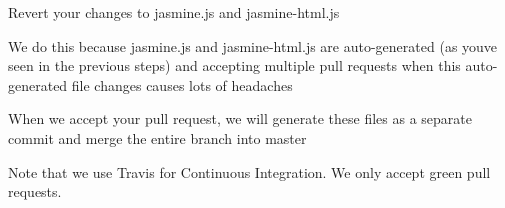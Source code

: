 \begin{DoxyEnumerate}
\item Revert your changes to {\ttfamily jasmine.\+js} and {\ttfamily jasmine-\/html.\+js}
\begin{DoxyItemize}
\item We do this because {\ttfamily jasmine.\+js} and {\ttfamily jasmine-\/html.\+js} are auto-\/generated (as you\textquotesingle{}ve seen in the previous steps) and accepting multiple pull requests when this auto-\/generated file changes causes lots of headaches
\end{DoxyItemize}
\end{DoxyEnumerate}
\begin{DoxyEnumerate}
\item When we accept your pull request, we will generate these files as a separate commit and merge the entire branch into master
\end{DoxyEnumerate}

Note that we use Travis for Continuous Integration. We only accept green pull requests. 